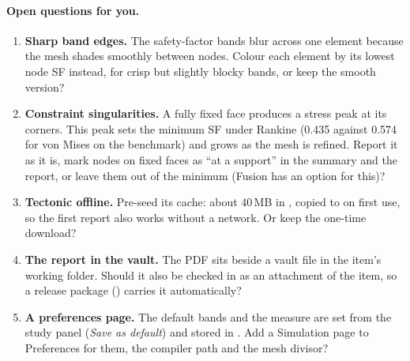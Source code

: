\paragraph{Open questions for you.}
\begin{enumerate}[nosep]
  \item \textbf{Sharp band edges.} The safety-factor bands blur across one element because the mesh shades
        smoothly between nodes. Colour each element by its lowest node SF instead, for crisp but slightly
        blocky bands, or keep the smooth version?
  \item \textbf{Constraint singularities.} A fully fixed face produces a stress peak at its corners. This peak
        sets the minimum SF under Rankine (0.435 against 0.574 for von Mises on the benchmark) and grows as the
        mesh is refined. Report it as it is, mark nodes on fixed faces as ``at a support'' in the summary and
        the report, or leave them out of the minimum (Fusion has an option for this)?
  \item \textbf{Tectonic offline.} Pre-seed its cache: about 40\,MB in , copied to
         on first use, so the first report also works without a
        network. Or keep the one-time download?
  \item \textbf{The report in the vault.} The PDF sits beside a vault file in the item's working folder. Should
        it also be checked in as an attachment of the item, so a release package () carries it
        automatically?
  \item \textbf{A preferences page.} The default bands and the measure are set from the study panel (\emph{Save as
        default}) and stored in . Add a Simulation page to Preferences for them, the
        compiler path and the mesh divisor?
\end{enumerate}
